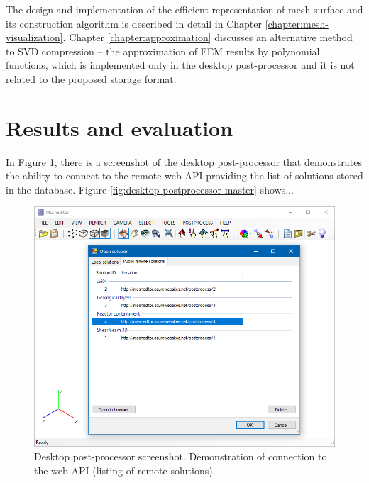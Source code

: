 The design and implementation of the efficient representation of mesh surface and its construction algorithm is described in detail in Chapter \ref{chapter:mesh-visualization}. Chapter \ref{chapter:approximation} discusses an alternative method to SVD compression -- the approximation of FEM results by polynomial functions, which is implemented only in the desktop post-processor and it is not related to the proposed storage format.



\pagebreak

\section{Results and evaluation}



In Figure \ref{fig:desktop-postprocessor-remote-solutions}, there is a screenshot of the desktop post-processor that demonstrates the ability to connect to the remote web API providing the list of solutions stored in the database. Figure \ref{fig:desktop-postprocessor-master} shows...

\begin{figure}[H]
    \centering
    \includegraphics[width=\textwidth]{figures/chapter-data-management/desktop-postprocessor-remote-solutions}
    \decoRule
    \caption[Desktop post-processor screenshot. List of remote solutions.]{Desktop post-processor screenshot. Demonstration of connection to the web API (listing of remote solutions).}
    \label{fig:desktop-postprocessor-remote-solutions}
\end{figure}

